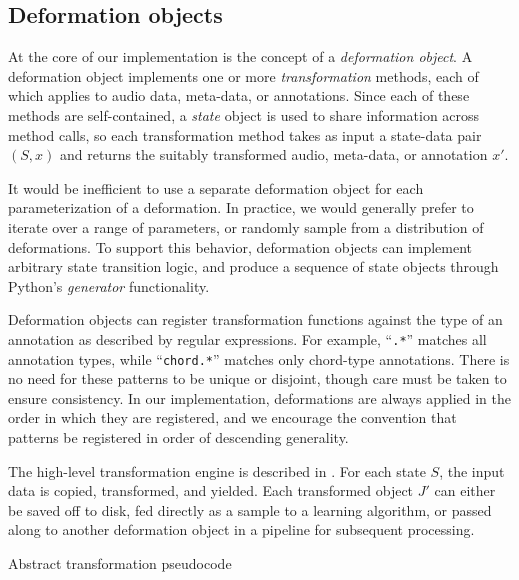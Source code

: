 \documentclass{article}
\begin{document}
\subsection{Deformation objects}

At the core of our implementation is the concept of a \emph{deformation object}.
A deformation object implements one or more \emph{transformation} methods, each of which 
applies to audio data, meta-data, or annotations.  Since each of these methods are
self-contained, a \emph{state} object is used to share information across method calls,
so each transformation method takes as input a state-data pair $(S, x)$ and returns the 
suitably transformed audio, meta-data, or annotation $x'$.

It would be inefficient to use a separate deformation object for each parameterization of
a deformation.  In practice, we would generally prefer to iterate over a range of
parameters, or randomly sample from a distribution of deformations.  To support this
behavior, deformation objects can implement arbitrary state transition logic, and produce
a sequence of state objects through Python's \emph{generator} functionality.

Deformation objects can register transformation functions against the type of an
annotation as described by regular expressions.  For example, ``\texttt{.*}'' matches all 
annotation types, while ``\texttt{chord.*}'' matches only chord-type annotations.
There is no need for these patterns to be unique or disjoint, though care must be taken
to ensure consistency.  In our implementation, deformations are always applied in the
order in which they are registered, and we encourage the convention that patterns be
registered in order of descending generality.

The high-level transformation engine is described in
.  For each state $S$, the input data is copied, transformed,
and yielded.  Each transformed object $J'$ can either be saved off to disk, fed directly
as a sample to a learning algorithm, or passed along to another deformation object in a
pipeline for subsequent processing.

\begin{algorithm}[t]
\caption{Abstract transformation pseudocode\label{alg:transformation}}
\begin{algorithmic}[1]
            \EndFor{}
        \EndFor{}
    \EndFor{}
    \EndFunction{}
\end{algorithmic}
\end{algorithm}
\end{document}
